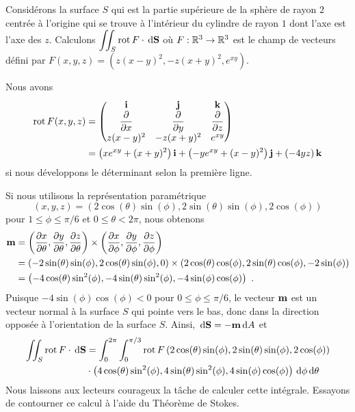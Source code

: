 {\begin{egg}
Considérons la surface $S$ qui est la partie supérieure de la sphère
de rayon $2$ centrée à l'origine qui se trouve à l'intérieur du
cylindre de rayon $1$ dont l'axe est l'axe des $z$.   Calculons
$\displaystyle \iint_S \operatorname{rot}  F \cdot \,\mathrm{d}\mathbf{S}$ où
$F:\mathbb{R}^3 \to \mathbb{R}^3$ est le champ de vecteurs défini par
$F(x,y,z) = \left( z(x-y)^2, -z(x+y)^2, e^{xy} \right)$.

Nous avons
\begin{align*}
\operatorname{rot} F(x,y,z) &=
\begin{pmatrix}
\mathbf{i} & \mathbf{j} & \mathbf{k} \\
\displaystyle \frac{\partial }{\partial x} & \displaystyle \frac{\partial }{\partial y}
& \displaystyle \frac{\partial }{\partial z} \\  
z(x-y)^2 & -z(x+y)^2 & e^{xy}
\end{pmatrix} \\
&= \left(xe^{xy} + (x+y)^2\right)\mathbf{i} + \left( -ye^{xy} + (x-y)^2\right)\mathbf{j}
+ \left( -4 yz \right)\mathbf{k}
\end{align*}
si nous développons le déterminant selon la première ligne.

Si nous utilisons la représentation paramétrique
\[
(x,y,z) = (2\cos(\theta)\sin(\phi), 2\sin(\theta)\sin(\phi),2\cos(\phi))
\]
pour $1 \leq \phi \leq \pi/6$ et $0 \leq \theta < 2\pi$, nous obtenons
\begin{align*}
\mathbf{m} &= \left( \frac{\partial x}{\partial \theta} , \frac{\partial y}{\partial \theta} ,
\frac{\partial z}{\partial \theta} \right)
\times \left( \frac{\partial x}{\partial \phi} , \frac{\partial y}{\partial \phi} ,
\frac{\partial z}{\partial \phi} \right) \\
&= \left( -2 \sin(\theta)\sin(\phi), 2\cos(\theta)\sin(\phi),0 \right)
\times
\left( 2\cos(\theta)\cos(\phi) , 2\sin(\theta)\cos(\phi) ,
-2\sin(\phi) \right) \\
&= \left( -4\cos(\theta)\sin^2(\phi) , -4 \sin(\theta)\sin^2(\phi) ,
-4 \sin(\phi)\cos(\phi)  \right) \ .
\end{align*}
Puisque $-4 \sin(\phi)\cos(\phi) <0$ pour $0\leq \phi \leq \pi/6$, le
vecteur $\displaystyle \mathbf{m}$ est un vecteur normal à la surface $S$
qui pointe vers le bas, donc dans la direction opposée à
l'orientation de la surface $S$.  Ainsi,
$\,\mathrm{d}\mathbf{S} = -\mathbf{m} \,\mathrm{d}A$ et
\begin{align*}
\iint_S \operatorname{rot}  F \cdot \,\mathrm{d}\mathbf{S}
&= \int_0^{2\pi}\int_0^{\pi/3} \operatorname{rot}  F\left(
2\cos(\theta)\sin(\phi),2\sin(\theta)\sin(\phi),2\cos(\phi)\right) \\
&\cdot \left( 4\cos(\theta)\sin^2(\phi) , 4 \sin(\theta)\sin^2(\phi) ,
4 \sin(\phi)\cos(\phi)  \right) \,\mathrm{d}\phi\,\mathrm{d}\theta
\end{align*}
Nous laissons aux lecteurs courageux la tâche de calculer cette
intégrale.  Essayons de contourner ce calcul à l'aide du Théorème de
Stokes.


\end{egg}}
